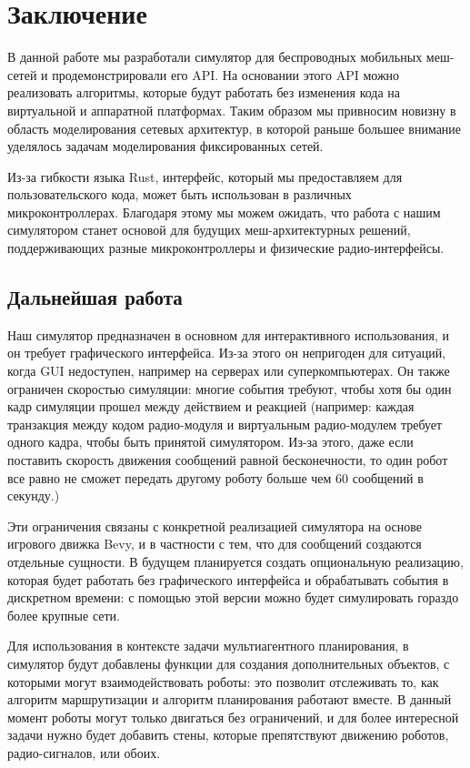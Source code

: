 \documentclass[%
]{article}
\begin{document}
\section{Заключение}

В данной работе мы разработали симулятор для беспроводных мобильных меш-сетей
и продемонстрировали его API.
На основании этого API можно реализовать алгоритмы, которые будут
работать без изменения кода на виртуальной и аппаратной платформах.
Таким образом мы привносим новизну в область моделирования сетевых архитектур,
в которой раньше большее внимание уделялось задачам моделирования фиксированных сетей.

Из-за гибкости языка Rust,
интерфейс, который мы предоставляем для пользовательского кода,
может быть использован в различных микроконтроллерах.
Благодаря этому мы можем ожидать,
что работа с нашим симулятором станет основой
для будущих меш-архитектурных решений,
поддерживающих разные микроконтроллеры
и физические радио-интерфейсы.

\subsection{Дальнейшая работа}

Наш симулятор предназначен в основном для интерактивного использования,
и он требует графического интерфейса.
Из-за этого он непригоден для ситуаций, когда GUI недоступен,
например на серверах или суперкомпьютерах.
Он также ограничен скоростью симуляции:
многие события требуют, чтобы хотя бы один кадр симуляции прошел
между действием и реакцией
(например: каждая транзакция между кодом радио-модуля
и виртуальным радио-модулем
требует одного кадра,
чтобы быть принятой симулятором.
Из-за этого,
даже если поставить скорость движения сообщений равной бесконечности,
то один робот все равно не сможет передать другому роботу
больше чем 60 сообщений в секунду.)

Эти ограничения связаны с конкретной реализацией симулятора
на основе игрового движка Bevy,
и в частности с тем, что для сообщений создаются отдельные сущности.
В будущем планируется создать опциональную реализацию,
которая будет работать без графического интерфейса
и обрабатывать события в дискретном времени:
с помощью этой версии можно будет симулировать гораздо более крупные сети.

Для использования в контексте задачи
мультиагентного планирования,
в симулятор будут добавлены
функции для создания дополнительных объектов,
с которыми могут взаимодействовать роботы:
это позволит отслеживать то,
как алгоритм маршрутизации и алгоритм планирования работают вместе.
В данный момент роботы могут только двигаться без ограничений,
и для более интересной задачи нужно будет добавить стены, которые препятствуют движению роботов,
радио-сигналов, или обоих.
\end{document}
